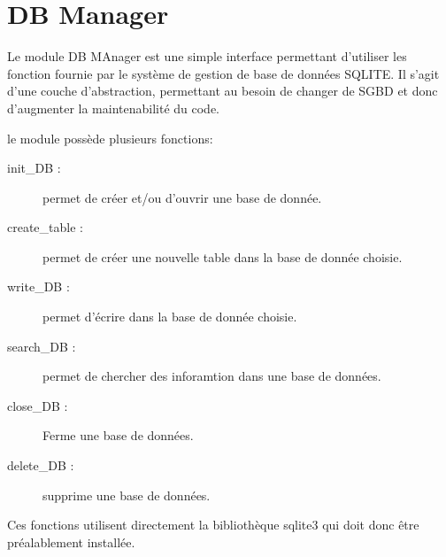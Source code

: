\section{DB Manager} 

Le module DB MAnager est une simple interface permettant d'utiliser les fonction fournie par le système de gestion de base de données SQLITE. Il s'agit d'une couche d'abstraction, permettant au besoin de changer de SGBD et donc d'augmenter la maintenabilité du code. 

le module possède plusieurs fonctions:

\begin{description}
\item[init\_DB :] permet de créer et/ou d'ouvrir une base de donnée.
\item[create\_table :] permet de créer une nouvelle table dans la base de donnée choisie.
\item[write\_DB :] permet d'écrire dans la base de donnée choisie.
\item[search\_DB :] permet de chercher des inforamtion dans une base de données.
\item[close\_DB :] Ferme une base de données.
\item[delete\_DB :] supprime une base de données.
\end{description}

Ces fonctions utilisent directement la bibliothèque sqlite3 qui doit donc être préalablement installée. 
